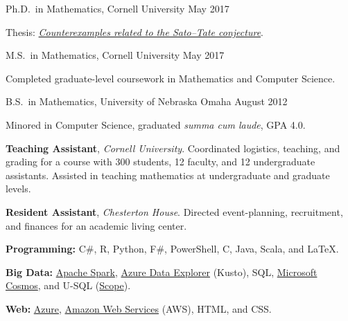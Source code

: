 \documentclass[11pt, letterpaper]{awesome-cv}
\begin{document}
\begin{cventries}

\cventry
  {Ph.D.~in Mathematics, Cornell University}
  {}{}
  {May 2017}
  {
    \begin{cvitems}
      \item{Thesis: \href{http://doi.org/10.7298/X4PN93Q3}{\emph{Counterexamples related to the Sato--Tate conjecture}}.}
    \end{cvitems}
  }
  
\cventry
  {M.S.~in Mathematics, Cornell University}
  {}{}
  {May 2017}
  {
    \begin{cvitems}
      \item{Completed graduate-level coursework in Mathematics and Computer Science.}
    \end{cvitems}
  }
  
\cventry
  {B.S.~in Mathematics, University of Nebraska Omaha}
  {}{}
  {August 2012}
  {
    \begin{cvitems}
      \item{Minored in Computer Science, graduated \emph{summa cum laude}, GPA 4.0.}
    \end{cvitems}
  }
  
\end{cventries}






\begin{cvparagraph}
\textbf{Teaching Assistant}, \emph{Cornell University}. Coordinated logistics, teaching, and grading for a course with 300 students, 12 faculty, and 12 undergraduate assistants.
Assisted in teaching mathematics at undergraduate and graduate levels.

\textbf{Resident Assistant}, \emph{Chesterton House}. Directed event-planning, recruitment, and finances for an academic living center. 
\end{cvparagraph}






\begin{cvparagraph}
\textbf{Programming:} C\#, R, Python, F\#, PowerShell, C, Java, Scala, and \LaTeX.

\textbf{Big Data:}
\href{https://spark.apache.org/}{Apache Spark},
\href{https://docs.microsoft.com/en-us/azure/kusto/query/index}{Azure Data Explorer} (Kusto),
SQL,
\href{https://docs.microsoft.com/en-us/azure/cosmos-db/introduction}{Microsoft Cosmos},
and
U-SQL (\href{https://doi.org/10.14778/1454159.1454166}{Scope}).

\textbf{Web:} 
\href{https://azure.microsoft.com/}{Azure}, 
\href{https://aws.amazon.com/}{Amazon Web Services} (AWS), 
HTML, and CSS.
\end{cvparagraph}
\end{document}
